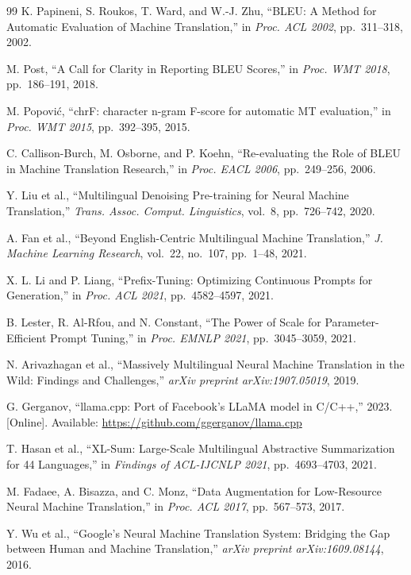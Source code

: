 \documentclass[conference]{IEEEtran}
\begin{document}
\begin{thebibliography}{99}
K. Papineni, S. Roukos, T. Ward, and W.-J. Zhu,
``BLEU: A Method for Automatic Evaluation of Machine Translation,''
in \textit{Proc. ACL 2002}, pp.~311--318, 2002.

M. Post, ``A Call for Clarity in Reporting BLEU Scores,''
in \textit{Proc. WMT 2018}, pp.~186--191, 2018.

M. Popovi\'{c}, ``chrF: character n-gram F-score for automatic MT evaluation,''
in \textit{Proc. WMT 2015}, pp.~392--395, 2015.

C. Callison-Burch, M. Osborne, and P. Koehn,
``Re-evaluating the Role of BLEU in Machine Translation Research,''
in \textit{Proc. EACL 2006}, pp.~249--256, 2006.

Y. Liu et al., ``Multilingual Denoising Pre-training for Neural Machine Translation,''
\textit{Trans. Assoc. Comput. Linguistics}, vol.~8, pp.~726--742, 2020.

A. Fan et al., ``Beyond English-Centric Multilingual Machine Translation,''
\textit{J. Machine Learning Research}, vol.~22, no.~107, pp.~1--48, 2021.

X. L. Li and P. Liang, ``Prefix-Tuning: Optimizing Continuous Prompts for Generation,''
in \textit{Proc. ACL 2021}, pp.~4582--4597, 2021.

B. Lester, R. Al-Rfou, and N. Constant,
``The Power of Scale for Parameter-Efficient Prompt Tuning,''
in \textit{Proc. EMNLP 2021}, pp.~3045--3059, 2021.

N. Arivazhagan et al., ``Massively Multilingual Neural Machine Translation in the Wild:
Findings and Challenges,''
\textit{arXiv preprint arXiv:1907.05019}, 2019.

G. Gerganov, ``llama.cpp: Port of Facebook's LLaMA model in C/C++,'' 2023.
[Online]. Available: \url{https://github.com/ggerganov/llama.cpp}

T. Hasan et al., ``XL-Sum: Large-Scale Multilingual Abstractive Summarization
for 44 Languages,''
in \textit{Findings of ACL-IJCNLP 2021}, pp.~4693--4703, 2021.

M. Fadaee, A. Bisazza, and C. Monz,
``Data Augmentation for Low-Resource Neural Machine Translation,''
in \textit{Proc. ACL 2017}, pp.~567--573, 2017.

Y. Wu et al., ``Google's Neural Machine Translation System: Bridging the Gap between
Human and Machine Translation,''
\textit{arXiv preprint arXiv:1609.08144}, 2016.


\end{thebibliography}
\end{document}
